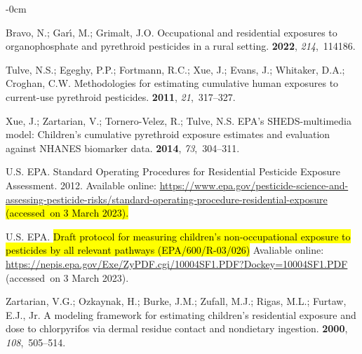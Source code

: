 \documentclass[toxics,article,accept,pdftex,moreauthors]{Definitions/mdpi}
\begin{document}
\begin{adjustwidth}{-\extralength}{0cm}
\begin{thebibliography}{999}
Bravo, N.; Gar{\'\i}, M.; Grimalt, J.O.
\newblock Occupational and residential exposures to organophosphate and
  pyrethroid pesticides in a rural setting.
 {\bf 2022}, {\em 214},~114186.

Tulve, N.S.; Egeghy, P.P.; Fortmann, R.C.; Xue, J.; Evans, J.; Whitaker, D.A.;
  Croghan, C.W.
\newblock Methodologies for estimating cumulative human exposures to
  current-use pyrethroid pesticides.
 {\bf
  2011}, {\em 21},~317--327.

Xue, J.; Zartarian, V.; Tornero-Velez, R.; Tulve, N.S.
\newblock EPA's SHEDS-multimedia model: Children's cumulative pyrethroid
  exposure estimates and evaluation against NHANES biomarker data.
 {\bf 2014}, {\em 73},~304--311.

{U.S. EPA}.
\newblock Standard Operating Procedures for Residential Pesticide Exposure
  Assessment.  2012.
\newblock Available online:
  \url{https://www.epa.gov/pesticide-science-and-assessing-pesticide-risks/standard-operating-procedure-residential-exposure} \hl{(accessed~on 3 March 2023).} %

{U.S. EPA}.
\newblock \hl{Draft protocol for measuring children’s non-occupational exposure
  to pesticides by all relevant pathways (EPA/600/R-03/026)} %
\newblock Avaliable online:
  \url {https://nepis.epa.gov/Exe/ZyPDF.cgi/10004SF1.PDF?Dockey=10004SF1.PDF} (accessed~on 3 March 2023).

Zartarian, V.G.; Ozkaynak, H.; Burke, J.M.; Zufall, M.J.; Rigas, M.L.;
  Furtaw, E.J., Jr.
\newblock A modeling framework for estimating children's residential exposure
  and dose to chlorpyrifos via dermal residue contact and nondietary ingestion.
 {\bf 2000}, {\em
  108},~505--514.


\end{thebibliography}
\end{adjustwidth}
\end{document}
